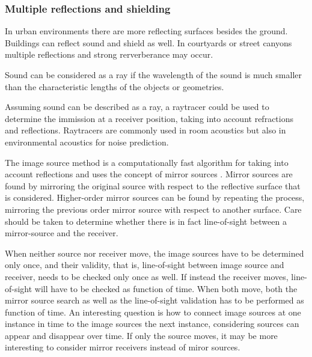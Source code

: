 




\subsubsection{Multiple reflections and shielding} %
In urban environments there are more reflecting surfaces besides the ground.
Buildings can reflect sound and shield as well. In courtyards or street canyons
multiple reflections and strong rerverberance may occur.

Sound can be considered as a ray if the wavelength of the sound is much smaller
than the characteristic lengths of the objects or geometries. %

Assuming sound can be described as a ray, a raytracer could be used to determine
the immission at a receiver position, taking into account refractions and
reflections. Raytracers are commonly used in room acoustics but also in
environmental acoustics for noise prediction.

The image source method is a computationally fast algorithm for taking into
account reflections and uses the concept of mirror sources
\cite{Allen1979,Mechel2013}. Mirror sources are found by mirroring the original
source with respect to the reflective surface that is considered. Higher-order
mirror sources can be found by repeating the process, mirroring the previous
order mirror source with respect to another surface. Care should be taken to
determine whether there is in fact line-of-sight between a mirror-source and the
receiver.

When neither source nor receiver move, the image sources have to be determined
only once, and their validity, that is, line-of-sight between image source and
receiver, needs to be checked only once as well. If instead the receiver moves,
line-of-sight will have to be checked as function of time. When both move, both
the mirror source search as well as the line-of-sight validation has to be
performed as function of time. An interesting question is how to connect image
sources at one instance in time to the image sources the next instance,
considering sources can appear and disappear over time. If only the source
moves, it may be more interesting to consider mirror receivers instead of miror
sources.









